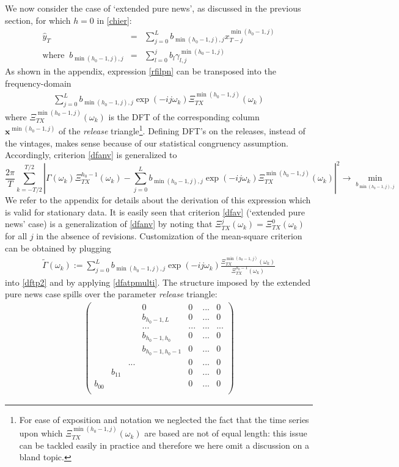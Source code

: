 \documentclass[11pt]{article}
\begin{document}
We now consider the case of `extended pure news', as discussed in the previous section, for which $h=0$ in \ref{chier}:
\begin{eqnarray}
\hat{y}_T&=&\sum_{j=0}^{L} b_{\min(h_0-1,j),j}x_{T-j}^{\min(h_0-1,j)}\label{rfilpn}\\
\textrm{where~}~b_{\min(h_0-1,j),j}&=&\sum_{l=0}^{j} b_l\gamma_{l,j}^{\min(h_0-1,j)}\label{brfilpn}
\end{eqnarray}
As shown in the appendix,  expression \ref{rfilpn} can be transposed into the frequency-domain
\begin{eqnarray}\label{asv}
\sum_{j=0}^{L}b_{\min(h_0-1,j),j} \exp(-ij\omega_k)\Xi_{TX}^{\min(h_0-1,j)}(\omega_k)
\end{eqnarray}
where $\Xi_{TX}^{\min(h_0-1,j)}(\omega_k)$ is the DFT of the corresponding column  $\mathbf{x}^{\min(h_0-1,j)}$ of the \emph{release} triangle\footnote{For ease of exposition and notation we neglected the fact that the time series upon which $\Xi_{TX}^{\min(h_0-1,j)}(\omega_k)$ are based are not of equal length: this issue can be tackled easily in practice and therefore we here omit a discussion on a bland topic.}. Defining DFT's on the releases, instead of the vintages, makes sense because of our statistical congruency assumption.
Accordingly, criterion \ref{dfanv} is generalized to
\begin{equation}\label{dfav}
\frac{2\pi}{T} \sum_{k=-T/2}^{T/2}
\left|\Gamma(\omega_k)\Xi_{TX}^{h_0-1}(\omega_k)-\sum_{j=0}^Lb_{\min(h_0-1,j),j}\exp(-ij\omega_k)\Xi_{TX}^{\min(h_0-1,j)}(\omega_k)\right|^2 \to\min_{b_{\min(h_0-1,j),j}}
\end{equation}
We refer to the appendix for details about the derivation of this expression which is valid for stationary data. It is easily seen that criterion \ref{dfav} (`extended pure news' case) is a generalization of \ref{dfanv} by noting that $\Xi_{TX}^j(\omega_k)=\Xi_{TX}^0(\omega_k)$ for all $j$ in the absence of  revisions.
Customization of the mean-square criterion can be obtained by plugging
\begin{eqnarray}\label{dftp1}
\tilde{\Gamma}(\omega_k):=\sum_{j=0}^Lb_{\min(h_0-1,j),j}\exp(-ij\omega_k)\frac{\Xi_{TX}^{\min(h_0-1,j)}(\omega_k)}{\Xi_{TX}^{h_0-1}(\omega_k)}
\end{eqnarray}
into \ref{dftp2} and by applying \ref{dfatpmulti}. The structure imposed by the extended pure news case spills over the parameter \emph{release} triangle:
\begin{eqnarray*}
\left(
  \begin{array}{ccccccc}
    &   &  & 0 &0&...&0   \\
    &   &  & b_{h_0-1,L} &0&...&0   \\
    &   &  & ... &...&...&...   \\
    &   &  & b_{h_0-1,h_0} &0&...&0   \\
     &  &  & b_{h_0-1,h_0-1} &0&...&0  \\
     & &... &  &0&...&0   \\
     & b_{11} &  &  &0&...&0   \\
    b_{00} &  &  &  &0&...&0  \\
  \end{array}
\right)
\end{eqnarray*}
\end{document}
